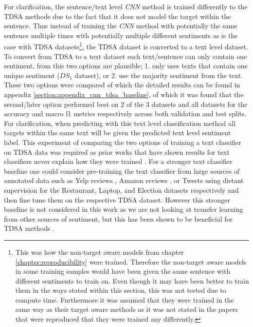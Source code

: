 For clarification, the sentence/text level \textit{CNN} method is trained differently to the TDSA methods due to the fact that it does not model the target within the sentence. Thus instead of training the \textit{CNN} method with potentially the same sentence multiple times with potentially multiple different sentiments as is the case with TDSA datasets\footnote{This was how the non-target aware models from chapter \ref{chapter:reproducibility} were trained. Therefore the non-target aware models in some training samples would have been given the same sentence with different sentiments to train on. Even though it may have been better to train them in the ways stated within this section, this was not tested due to compute time. Furthermore it was assumed that they were trained in the same way as their target aware methods as it was not stated in the papers \citep{vo2015target, tang-etal-2016-effective, wang-etal-2017-tdparse} that were reproduced that they were trained any differently.}, the TDSA dataset is converted to a text level dataset. To convert from TDSA to a text dataset each text/sentence can only contain one sentiment, from this two options are plausible; 1. only uses texts that contain one unique sentiment ($DS_1$ dataset), or 2. use the majority sentiment from the text. These two options were compared of which the detailed results can be found in appendix \ref{section:appendix_cnn_tdsa_baseline}, of which it was found that the second/later option performed best on 2 of the 3 datasets and all datasets for the accuracy and macro f1 metrics respectively across both validation and test splits. For clarification, when predicting with this text level classification method all targets within the same text will be given the predicted text level sentiment label. This experiment of comparing the two options of training a text classifier on TDSA data was required as prior works that have shown results for text classifiers never explain how they were trained \citep{tang-etal-2016-aspect,wang-etal-2016-attention,he-etal-2018-exploiting,jiang-etal-2019-challenge}. For a stronger text classifier baseline one could consider pre-training the text classifier from large sources of annotated data such as Yelp reviews \citep{tang-etal-2015-learning}, Amazon reviews \citep{mcauley2015image,he2016ups}, or Tweets using distant supervision \citep{go2009twitter} for the Restaurant, Laptop, and Election datasets respectively and then fine tune them on the respective TDSA dataset. However this stronger baseline is not considered in this work as we are not looking at transfer learning from other sources of sentiment, but this has been shown to be beneficial for TDSA methods \citep{he-etal-2018-exploiting}.  


